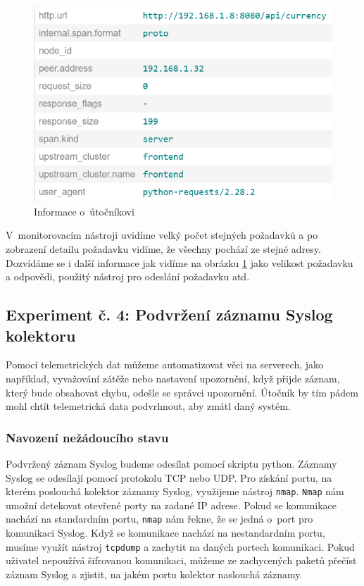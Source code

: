 \begin{figure}[H]
  \centering
  \includegraphics[width=12cm]{obrazky-figures/detailStopyJeager.png}
  \caption{Informace o~útočníkovi}
  \label{fig:detailDos}
\end{figure}

V~monitorovacím nástroji uvidíme velký počet stejných požadavků a po zobrazení detailu požadavku vidíme, že všechny pochází ze stejné adresy. Dozvídáme se i další informace jak vidíme na obrázku \ref{fig:detailDos} jako velikost požadavku a odpovědi, použitý nástroj pro odeslání požadavku atd.


\subsection{Experiment č. 4: Podvržení záznamu Syslog kolektoru}

Pomocí telemetrických dat můžeme automatizovat věci na serverech, jako například, vyvažování zátěže nebo nastavení upozornění, když přijde záznam, který bude obsahovat chybu, odešle se správci upozornění. Útočník by tím pádem mohl chtít telemetrická data podvrhnout, aby zmátl daný systém.

\subsubsection{Navození nežádoucího stavu}

Podvržený záznam Syslog budeme odesílat pomocí skriptu python. Záznamy Syslog se odesílají pomocí protokolu TCP nebo UDP. Pro získání portu, na kterém poslouchá kolektor záznamy Syslog, využijeme nástroj \texttt{nmap}. \texttt{Nmap} nám umožní detekovat otevřené porty na zadané IP adrese. Pokud se komunikace nachází na standardním portu, \texttt{nmap} nám řekne, že se jedná o~port pro komunikaci Syslog. Když se komunikace nachází na nestandardním portu, musíme využít nástroj \texttt{tcpdump} a zachytit na daných portech komunikaci. Pokud uživatel nepoužívá šifrovanou komunikaci, můžeme ze zachycených paketů přečíst záznam Syslog a zjistit, na jakém portu kolektor naslouchá záznamy.


